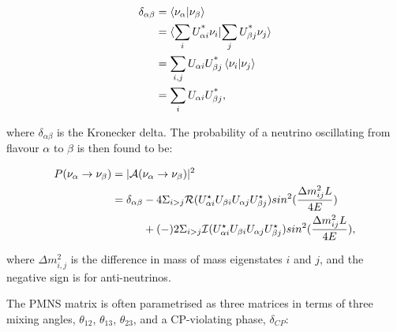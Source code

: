  \begin{equation}
 \begin{aligned}
\delta_{\alpha\beta} &= \bra{\nu_\alpha}\ket{\nu_\beta}\\
&= \langle\sum_i U^{\text{*}}_{\alpha i}\nu_i}|{\sum_j U^{\text{*}}_{\beta j}\nu_j\rangle\\
&= \sum_{i,j}U_{\alpha i}U^{\text{*}}_{\beta j}\bra{\nu_i}\ket{\nu_j}\\
&=\sum_i U_{\alpha i}U^{\text{*}}_{\beta j},
 \end{aligned}
\end{equation}

where $\delta_{\alpha\beta}$ is the Kronecker delta. The probability of a neutrino oscillating from flavour $\alpha$ to $\beta$ is then found to be:

\begin{equation}
\begin{aligned}
P(\nu_\alpha \rightarrow \nu_\beta) &= |\mathcal{A}(\nu_\alpha \rightarrow \nu_\beta)|^2 \\
&= \delta_{\alpha\beta} - 4 \Sigma_{i>j}\mathcal{R}(U_{\alpha i}^\star U_{\beta i} U_{\alpha j} U_{\beta j}^\star) sin^2 (\frac{\Delta m^2_{ij}L}{4E})\\ 
&\hphantom{= \delta_{\alpha\beta}.}+(-) 2 \Sigma_{i>j}\mathcal{I}(U_{\alpha i}^\star U_{\beta i} U_{\alpha j} U_{\beta j}^\star) sin^2 (\frac{\Delta m^2_{ij}L}{4E}),
\end{aligned}
\label{eqn:oscprob}
\end{equation}

where $\Delta m^{2}_{i,j}$ is the difference in mass of mass eigenstates $i$ and $j$, and the negative sign is for anti-neutrinos.

The PMNS matrix is often parametrised as three matrices in terms of three mixing angles, $\theta_{12}$, $\theta_{13}$, $\theta_{23}$, and a CP-violating phase, $\delta_{CP}$:

